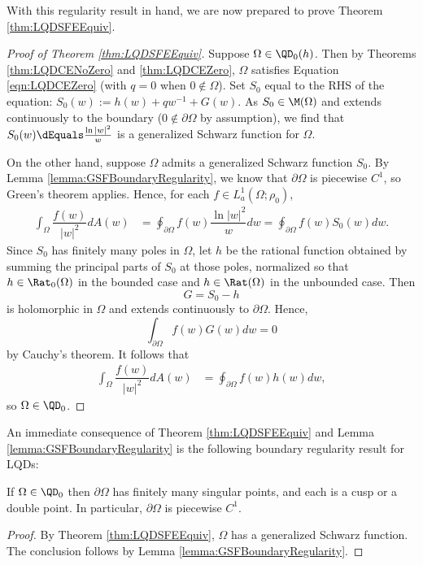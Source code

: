 \documentclass{article}
\numberwithin{equation}{section}
\begin{document}
\noindent With this regularity result in hand, we are now prepared to prove Theorem \ref{thm:LQDSFEEquiv}.

\begin{proof}[Proof of Theorem \ref{thm:LQDSFEEquiv}]
Suppose $\Omega\in\QD_0(h)$. Then by Theorems \ref{thm:LQDCENoZero} and \ref{thm:LQDCEZero}, $\Omega$ satisfies Equation \ref{eqn:LQDCEZero} (with $q=0$ when $0\notin\Omega$). Set $S_0$ equal to the RHS of the equation: $S_0(w):=h(w)+qw^{-1}+G(w)$. As $S_0\in\M(\Omega)$ and extends continuously to the boundary ($0\notin\partial\Omega$ by assumption), we find that $S_0(w)\dEquals\frac{\ln|w|^2}{w}$ is a generalized Schwarz function for $\Omega$.

On the other hand, suppose $\Omega$ admits a generalized Schwarz function $S_0$. By Lemma \ref{lemma:GSFBoundaryRegularity}, we know that $\partial\Omega$ is piecewise $C^1$, so Green's theorem applies. Hence, for each $f\in L_a^1(\Omega;\rho_0)$,
\begin{align*}
    \int_{\Omega}\dfrac{f(w)}{|w|^2}dA(w)&=\oint_{\partial\Omega}f(w)\dfrac{\ln|w|^2}{w}dw=\oint_{\partial\Omega}f(w)S_0(w)dw.
\end{align*}
Since $S_0$ has finitely many poles in $\Omega$, let $h$ be the rational function obtained by summing the principal parts of $S_0$ at those poles, normalized so that $h\in\Rat_0(\Omega)$ in the bounded case and $h\in\Rat(\Omega)$ in the unbounded case. Then
$$G=S_0-h$$
is holomorphic in $\Omega$ and extends continuously to $\partial\Omega$. Hence,
$$\int_{\partial\Omega}f(w)G(w)dw=0$$
by Cauchy's theorem. It follows that
\begin{align*}
    \int_{\Omega}\dfrac{f(w)}{|w|^2}dA(w)&=\oint_{\partial\Omega}f(w)h(w)dw,
\end{align*}
so $\Omega\in\QD_0$.
\end{proof}


An immediate consequence of Theorem \ref{thm:LQDSFEEquiv} and Lemma \ref{lemma:GSFBoundaryRegularity} is the following boundary regularity result for LQDs:
\begin{theorem}\label{thm:LQDBoundaryRegularity}
    If $\Omega\in\QD_0$ then $\partial\Omega$ has finitely many singular points, and each is a cusp or a double point. In particular, $\partial\Omega$ is piecewise $C^1$.
\end{theorem}
\begin{proof}
By Theorem \ref{thm:LQDSFEEquiv}, $\Omega$ has a generalized Schwarz function. The conclusion follows by Lemma \ref{lemma:GSFBoundaryRegularity}. 
\end{proof}
\end{document}
